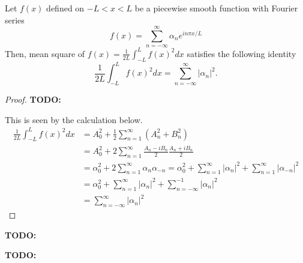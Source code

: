 \begin{theorem}
    Let $f(x)$ defined on $-L<x<L$ be a piecewise smooth function with Fourier series 
    \begin{equation}\label{eq.Parseval_complex_assumption}
        f(x)=\sum_{n=-\infty}^{\infty} \alpha_n e^{i n \pi x / L}
    \end{equation}
    Then, mean square of $f(x)=\frac{1}{2 L} \int_{-L}^L f(x)^2 d x$ satisfies the following identity
    \begin{equation}\label{eq.Parseval_complex}
        \frac{1}{2 L} \int_{-L}^L f(x)^2 d x=\sum_{n=-\infty}^{\infty}\left|\alpha_n\right|^2 .
    \end{equation}
\end{theorem}
\begin{proof}
    \textbf{TODO: }

    This is seen by the calculation below.
$$
\begin{aligned}
\frac{1}{2 L} \int_{-L}^L f(x)^2 d x & =A_0^2+\frac{1}{2} \sum_{n=1}^{\infty}\left(A_n^2+B_n^2\right) \\
& =A_0^2+2 \sum_{n=1}^{\infty} \frac{A_n-i B_n}{2} \frac{A_n+i B_n}{2} \\
& =\alpha_0^2+2 \sum_{n=1}^{\infty} \alpha_n \alpha_{-n}=\alpha_0^2+\sum_{n=1}^{\infty}\left|\alpha_n\right|^2+\sum_{n=1}^{\infty}\left|\alpha_{-n}\right|^2 \\
& =\alpha_0^2+\sum_{n=1}^{\infty}\left|\alpha_n\right|^2+\sum_{n=-\infty}^{-1}\left|\alpha_n\right|^2 \\
& =\sum_{n=-\infty}^{\infty}\left|\alpha_n\right|^2
\end{aligned}
$$

\end{proof}

\begin{theorem}
    \textbf{TODO: }
\end{theorem}

\begin{theorem}
    \textbf{TODO: }
\end{theorem}

